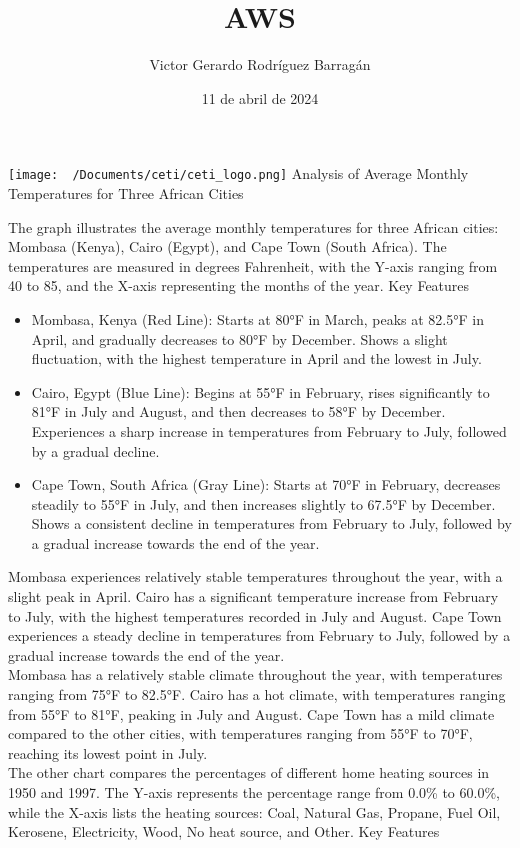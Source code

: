 \documentclass{article}
\title{AWS}
\author{Victor Gerardo Rodríguez Barragán}
\date{11 de abril de 2024}
\begin{document}
\maketitle
\texttt{[image: ~/Documents/ceti/ceti\_logo.png]}
\newpage
\justify
Analysis of Average Monthly Temperatures for Three African Cities

The graph illustrates the average monthly temperatures for three African cities: Mombasa (Kenya), Cairo (Egypt), and Cape Town (South Africa). The temperatures are measured in degrees Fahrenheit, with the Y-axis ranging from 40 to 85, and the X-axis representing the months of the year.
Key Features

\begin{itemize}
    \item Mombasa, Kenya (Red Line):
        Starts at 80°F in March, peaks at 82.5°F in April, and gradually decreases to 80°F by December.
        Shows a slight fluctuation, with the highest temperature in April and the lowest in July.
    \item Cairo, Egypt (Blue Line):
        Begins at 55°F in February, rises significantly to 81°F in July and August, and then decreases to 58°F by December.
        Experiences a sharp increase in temperatures from February to July, followed by a gradual decline.
    \item Cape Town, South Africa (Gray Line):
        Starts at 70°F in February, decreases steadily to 55°F in July, and then increases slightly to 67.5°F by December.
        Shows a consistent decline in temperatures from February to July, followed by a gradual increase towards the end of the year.
\end{itemize}

Mombasa experiences relatively stable temperatures throughout the year, with a slight peak in April.
Cairo has a significant temperature increase from February to July, with the highest temperatures recorded in July and August.
Cape Town experiences a steady decline in temperatures from February to July, followed by a gradual increase towards the end of the year.
\vspace{0.5cm}\\
Mombasa has a relatively stable climate throughout the year, with temperatures ranging from 75°F to 82.5°F.
Cairo has a hot climate, with temperatures ranging from 55°F to 81°F, peaking in July and August.
Cape Town has a mild climate compared to the other cities, with temperatures ranging from 55°F to 70°F, reaching its lowest point in July.
\vspace{0.5cm}\\
The other chart compares the percentages of different home heating sources in 1950 and 1997.
The Y-axis represents the percentage range from 0.0\% to 60.0\%, while the X-axis lists the
heating sources: Coal, Natural Gas, Propane, Fuel Oil, Kerosene, Electricity, Wood, No heat source, and Other.
Key Features
\end{document}
